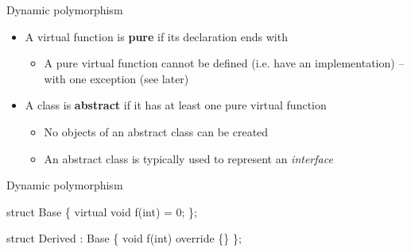 \begin{frame}{Dynamic polymorphism \insertcontinuationtext}

  \begin{itemize}
  \item A virtual function is \textbf{pure} if its declaration ends with
    \begin{itemize}
    \item A pure virtual function cannot be defined (i.e. have an
      implementation) -- with one exception (see later)
    \end{itemize}
  \item A class is \textbf{abstract} if it has at least one pure virtual
    function
    \begin{itemize}
    \item No objects of an abstract class can be created
    \item An abstract class is typically used to represent an \textit{interface} 
    \end{itemize}
  \end{itemize}

\end{frame}

\begin{frame}[fragile]{Dynamic polymorphism \insertcontinuationtext}

  \begin{codeblock}{
struct Base \{
  virtual void f(int) = 0;
\};

struct Derived : Base \{
  void f(int) override \{\ddd\}
\};

}\end{codeblock}

\end{frame}

